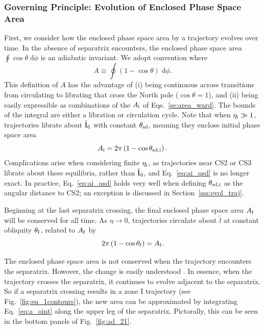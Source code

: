 \documentclass[
        fleqn,
        usenatbib,
    ]{mnras}
\newcommand*{\bm}[1]{\boldsymbol{\mathbf{#1}}}
\newcommand*{\uv}[1]{\hat{\bm{#1}}}
\newcommand*{\p}[1]{\left(#1\right)}
\begin{document}
\subsubsection{Governing Principle: Evolution of Enclosed Phase Space
Area}\label{sss:a_evo}

First, we consider how the enclosed phase space area by a trajectory evolves
over time. In the absence of separatrix encounters, the enclosed phase space
area $\oint \cos\theta \;\mathrm{d}\phi$ is an adiabatic invariant. We adopt
convention where
\begin{equation}
    A \equiv \oint \p{1 - \cos \theta}\;\mathrm{d}\phi.\label{eq:a_oint}
\end{equation}
This definition of $A$ has the advantage of (i) being continuous across
transitions from circulating to librating that cross the North pole
($\cos \theta = 1$), and (ii) being easily expressible as combinations of the
$A_{\rm i}$ of Eqs.~\eqref{se:area_ward}. The bounds of the integral are either
a libration or circulation cycle. Note that when $\eta_{\rm i} \gg 1$,
trajectories librate about $\uv{l}_{\rm d}$ with constant $\theta_{\rm sd}$,
meaning they enclose initial phase space area
\begin{equation}
    A_{\rm i} = 2\pi\p{1 - \cos \theta_{\rm sd, i}}.\label{eq:ai_qsd}
\end{equation}
Complications arise when considering finite $\eta_{\rm i}$, as trajectories near
CS2 or CS3 librate about these equilibria, rather than $\uv{l}_{\rm d}$, and
Eq.~\eqref{eq:ai_qsd} is no longer exact. In practice, Eq.~\eqref{eq:ai_qsd}
holds very well when defining $\theta_{\rm sd, i}$ as the angular distance to
CS2; an exception is discussed in Section~\ref{sss:evol_traj}.

Beginning at the last separatrix crossing, the final enclosed phase space area
$A_{\rm f}$ will be conserved for all time. As $\eta \to 0$, trajectories
circulate about $\hat{l}$ at constant obliquity $\theta_{\rm f}$, related to
$A_{\rm f}$ by
\begin{equation}
    2\pi\p{1 - \cos \theta_{\rm f}} = A_{\rm f}. \label{eq:qfaf}
\end{equation}

The enclosed phase space area is not conserved when the trajectory encounters
the separatrix. Howover, the change is easily understood \citep{henrard1982}. In
essence, when the trajectory crosses the separatrix, it continues to evolve
adjacent to the separatrix. So if a separatrix crossing results in a zone I
trajectory (see Fig.~\ref{fig:eq_1contours}), the new area can be approximated
by integrating Eq.~\eqref{eq:a_oint} along the upper leg of the separatrix.
Pictorally, this can be seen in the bottom panels of Fig.~\ref{fig:ad_21}.
\end{document}
